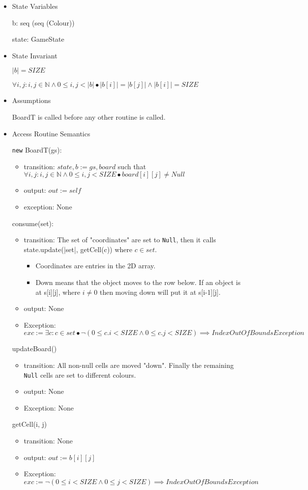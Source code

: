 \documentclass[11pt]{article}
\begin{document}
\begin{itemize}
\item State Variables
\label{sec:orgbbd54d8}

b: seq (seq (Colour))

state: GameState

\item State Invariant
\label{sec:orgd2f24c4}

\(|b| = SIZE\)

\(\forall i, j: i, j \in \mathbb{N} \land 0 \leq i,j < |b| \bullet |b[i]| = |b[j]| \land |b[i]| = SIZE\)

\item Assumptions
\label{sec:org03c75d5}

BoardT is called before any other routine is called.

\item Access Routine Semantics
\label{sec:org3bb968a}

\texttt{new} BoardT(gs):
\begin{itemize}
\item transition: \(state, b := gs, board\) such that \(\forall i, j: i,j \in \mathbb{N} \land 0 \leq i,j < SIZE \bullet board[i][j] \neq Null\)
\item output: \(out := self\)
\item exception: None
\end{itemize}


consume(set):
\begin{itemize}
\item transition: The set of "coordinates" are set to \texttt{Null}, then it calls state.update(|set|, getCell(c)) where \(c \in set\).
\begin{itemize}
\item Coordinates are entries in the 2D array.
\item Down means that the object moves to the row below. If an object is at s[i][j], where \(i \neq 0\) then moving down will put it at s[i-1][j].
\end{itemize}
\item output: None
\item Exception: \(exc:= \exists c: c \in set \bullet ¬ (0 \leq c.i < SIZE \land 0\leq c.j < SIZE) \implies IndexOutOfBoundsException\)
\end{itemize}

updateBoard()
\begin{itemize}
\item transition: All non-null cells are moved "down". Finally the remaining \texttt{Null} cells are set to different colours.
\item output: None
\item Exception: None
\end{itemize}

getCell(i, j)
\begin{itemize}
\item transition: None
\item output: \(out := b[i][j]\)
\item Exception: \(exc := ¬ (0 \leq i < SIZE \land 0 \leq j < SIZE) \implies IndexOutOfBoundsException\)
\end{itemize}
\end{itemize}
\end{document}
